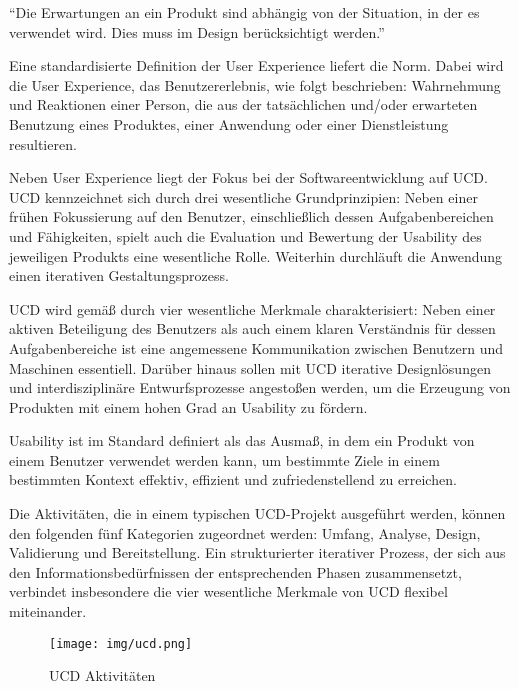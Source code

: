\epigraph{
\enquote{Die Erwartungen an ein Produkt sind abhängig von der Situation, in der es verwendet wird. Dies muss im Design berücksichtigt werden.}
\autocite{Moser.2012}
}{}

Eine standardisierte Definition der User Experience liefert die \citeauthor{ISO9241210} Norm. Dabei wird die User Experience, das Benutzererlebnis, wie folgt beschrieben: Wahrnehmung und Reaktionen einer Person, die aus der tatsächlichen und/oder erwarteten Benutzung eines Produktes, einer Anwendung oder einer Dienstleistung resultieren. 
\autocite{ISO9241210}

Neben User Experience liegt der Fokus bei der Softwareentwicklung auf \acl{UCD}. \ac{UCD} kennzeichnet sich durch drei wesentliche Grundprinzipien: Neben einer frühen Fokussierung auf den Benutzer, einschließlich dessen Aufgabenbereichen und Fähigkeiten, spielt auch die Evaluation und Bewertung der Usability des jeweiligen Produkts eine wesentliche Rolle. Weiterhin durchläuft die Anwendung einen iterativen Gestaltungsprozess. 
\autocite{Thesmann.2016}

\ac{UCD} wird gemäß \citeauthor{ISO9241210} durch vier wesentliche Merkmale charakterisiert: Neben einer aktiven Beteiligung des Benutzers als auch einem klaren Verständnis für dessen Aufgabenbereiche ist eine angemessene Kommunikation zwischen Benutzern und Maschinen essentiell. Darüber hinaus sollen mit \ac{UCD} iterative Designlösungen und interdisziplinäre Entwurfsprozesse angestoßen werden, um die Erzeugung von Produkten mit einem hohen Grad an Usability zu fördern.
\autocite{ISO9241210}

Usability ist im Standard \citeauthor{ISO924111} definiert als das Ausmaß, in dem ein Produkt von einem Benutzer verwendet werden kann, um bestimmte Ziele in einem bestimmten Kontext effektiv, effizient und zufriedenstellend zu erreichen. 
\autocite{ISO924111}

Die Aktivitäten, die in einem typischen \ac{UCD}-Projekt ausgeführt werden, können den folgenden fünf Kategorien zugeordnet werden: Umfang, Analyse, Design, Validierung und Bereitstellung. Ein strukturierter iterativer Prozess, der sich aus den Informationsbedürfnissen der entsprechenden Phasen zusammensetzt, verbindet insbesondere die vier wesentliche Merkmale von \ac{UCD} flexibel miteinander.

\begin{figure}[H]
	\centering 
	\texttt{[image: img/ucd.png]}
	\caption[\acl{UCD} Aktivitäten]{\label{fig:ucd}\acl{UCD} Aktivitäten
	\autocite[In Anlehnung an][]{Maedche.2012}
	}
\end{figure}

